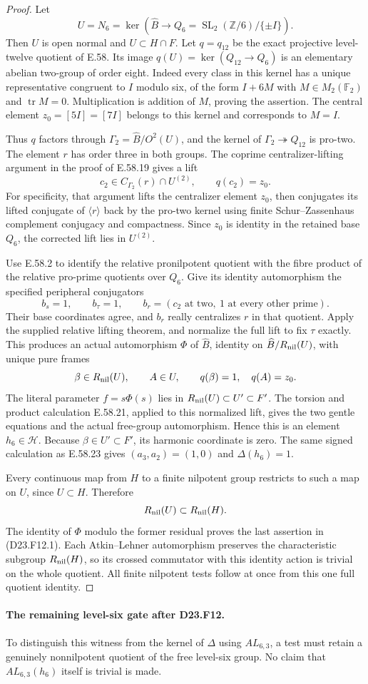 \begin{proof}
Let
\[
 U=N_6=\ker(\widehat B\longrightarrow
              Q_6=\operatorname{SL}_2(\mathbb Z/6)/\{\pm I\}).
\]
Then $U$ is open normal and $U\subset H\cap F$.
Let $q=q_{12}$ be the exact projective level-twelve quotient
of E.58. Its image $q(U)=\ker(Q_{12}\to Q_6)$ is an
elementary abelian two-group of order eight.  Indeed every
class in this kernel has a unique representative congruent
to $I$ modulo six, of the form $I+6M$ with
$M\in M_2(\mathbb F_2)$ and $\operatorname{tr}M=0$.
Multiplication is addition of $M$, proving the assertion.
The central element $z_0=[5I]=[7I]$ belongs to this kernel
and corresponds to $M=I$.

Thus $q$ factors through
$\Gamma_2=\widehat B/O^2(U)$, and the kernel of
$\Gamma_2\twoheadrightarrow Q_{12}$ is pro-two.
The element $r$ has order three in both groups.
The coprime centralizer-lifting argument in the proof of
E.58.19 gives a lift
\[
 c_2\in C_{\Gamma_2}(r)\cap U^{(2)},
 \qquad q(c_2)=z_0.
\]
For specificity, that argument lifts the centralizer
element $z_0$, then conjugates its lifted conjugate of
$\langle r\rangle$ back by the pro-two kernel using
finite Schur--Zassenhaus complement conjugacy and compactness.
Since $z_0$ is identity in the retained base $Q_6$, the
corrected lift lies in $U^{(2)}$.

Use E.58.2 to identify the relative pronilpotent quotient
with the fibre product of the relative pro-prime quotients
over $Q_6$.  Give its identity automorphism the specified
peripheral conjugators
\[
 b_s=1,\qquad b_\tau=1,\qquad
 b_r=(c_2\text{ at two},\ 1\text{ at every other prime}).
\]
Their base coordinates agree, and $b_r$ really centralizes
$r$ in that quotient.  Apply the supplied relative lifting
theorem, and normalize the full lift to fix $\tau$ exactly.
This produces an actual automorphism $\Phi$ of
$\widehat B$, identity on
$\widehat B/R_{\rm nil}(U)$, with unique pure frames
\[
 \beta\in R_{\rm nil}(U),\qquad A\in U,
 \qquad q(\beta)=1,\quad q(A)=z_0.
\]
The literal parameter $f=s\Phi(s)$ lies in
$R_{\rm nil}(U)\subset U'\subset F'$.
The torsion and product calculation E.58.21, applied to
this normalized lift, gives the two gentle equations and
the actual free-group automorphism.  Hence this is an
element $h_6\in\mathcal H$.  Because $\beta\in U'\subset F'$,
its harmonic coordinate is zero.  The same signed
calculation as E.58.23 gives $(a_3,a_2)=(1,0)$ and
$\Delta(h_6)=1$.

Every continuous map from $H$ to a finite nilpotent group
restricts to such a map on $U$, since $U\subset H$.
Therefore
\[
 R_{\rm nil}(U)\subset R_{\rm nil}(H).
\]
The identity of $\Phi$ modulo the former residual proves
the last assertion in (D23.F12.1).  Each Atkin--Lehner
automorphism preserves the characteristic subgroup
$R_{\rm nil}(H)$, so its crossed commutator with this
identity action is trivial on the whole quotient.
All finite nilpotent tests follow at once from this one
full quotient identity.
\end{proof}

\paragraph{The remaining level-six gate after D23.F12.}
To distinguish this witness from the kernel of $\Delta$
using $AL_{6,3}$, a test must retain a genuinely
nonnilpotent quotient of the free level-six group.
No claim that $AL_{6,3}(h_6)$ itself is trivial is made.
